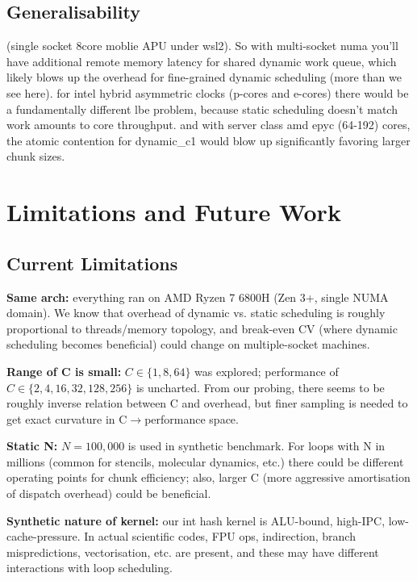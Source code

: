 \documentclass[conference]{IEEEtran}
\begin{document}
\subsection{Generalisability}

(single socket 8core moblie APU under wsl2). So with multi-socket numa you'll have additional remote memory latency for shared dynamic work queue, which likely blows up the overhead for fine-grained dynamic scheduling (more than we see here). for intel hybrid asymmetric clocks (p-cores and e-cores) there would be a fundamentally different lbe problem, because static scheduling doesn't match work amounts to core throughput. and with server class amd epyc (64-192) cores, the atomic contention for dynamic\_c1 would blow up significantly favoring larger chunk sizes.

\section{Limitations and Future Work}

\subsection{Current Limitations}

\textbf{Same arch:} everything ran on AMD Ryzen 7 6800H (Zen 3+, single NUMA domain). We know that overhead of dynamic vs. static scheduling is roughly proportional to threads/memory topology, and break-even CV (where dynamic scheduling becomes beneficial) could change on multiple-socket machines.

\textbf{Range of C is small:} $C \in \{1, 8, 64\}$ was explored; performance of $C \in \{2, 4, 16, 32, 128, 256\}$ is uncharted. From our probing, there seems to be roughly inverse relation between C and overhead, but finer sampling is needed to get exact curvature in C$\rightarrow$performance space.

\textbf{Static N:} $N=100,000$ is used in synthetic benchmark. For loops with N in millions (common for stencils, molecular dynamics, etc.) there could be different operating points for chunk efficiency; also, larger C (more aggressive amortisation of dispatch overhead) could be beneficial.

\textbf{Synthetic nature of kernel:} our int hash kernel is ALU-bound, high-IPC, low-cache-pressure. In actual scientific codes, FPU ops, indirection, branch mispredictions, vectorisation, etc. are present, and these may have different interactions with loop scheduling.
\end{document}
